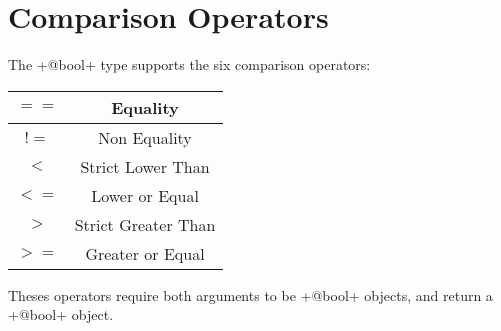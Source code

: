 \section{Comparison Operators}

The \ggs+@bool+ type supports the six comparison operators:\newline

\begin{tabular}{|c|c|}
\hline
$==$ & Equality \\
\hline
$!=$ & Non Equality \\
\hline
$<$  & Strict Lower Than \\
\hline
$<=$  & Lower or Equal \\
\hline
$>$  & Strict Greater Than \\
\hline
$>=$  & Greater or Equal \\
\hline
\end{tabular}

Theses operators require both arguments to be \ggs+@bool+ objects, and return a \ggs+@bool+ object.


